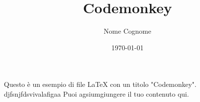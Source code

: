 \documentclass{article}
\title{Codemonkey}
\author{Nome Cognome}
\date{\today}
\begin{document}
\maketitle

Questo è un esempio di file LaTeX con un titolo "Codemonkey".
djfsnjfdsvivalafigaa Puoi agsiumgiungere il tuo contenuto qui.
\end{document}
